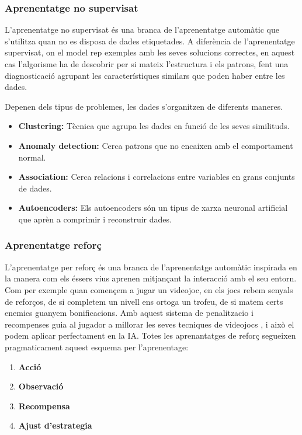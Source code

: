 \subsubsection{Aprenentatge no supervisat}\label{subsubsec:Aprenentatge no supervisat}

L'aprenentatge no supervisat és una branca de l'aprenentatge automàtic que s'utilitza quan no es disposa de dades etiquetades. A diferència de l'aprenentatge supervisat, on el model rep exemples amb les seves solucions correctes, en aquest cas l'algorisme ha de descobrir per si mateix l'estructura i els patrons, fent una diagnosticació agrupant les característiques similars que poden haber entre les dades.

Depenen dels tipus de  problemes, les dades s'organitzen de diferents maneres.
\begin{itemize}
 \item \textbf{Clustering:} Tècnica que agrupa les dades en funció de les seves similituds.
 \item \textbf{Anomaly detection:} Cerca patrons que no encaixen amb el comportament normal.
 \item \textbf{Association:} Cerca relacions i correlacions entre variables en grans conjunts de dades.
 \item \textbf{Autoencoders:} Els autoencoders són un tipus de xarxa neuronal artificial que aprèn a comprimir i reconstruir dades.
\end{itemize}


\subsubsection{Aprenentatge reforç}\label{subsubsec:Aprenentatge reforç}
L'aprenentatge per reforç és una branca de l'aprenentatge automàtic inspirada en la manera com els éssers vius aprenen mitjançant la interacció amb el seu entorn. Com per exemple quan començem a jugar un videojoc, en els jocs rebem senyals de reforços, de si completem un nivell ens ortoga un trofeu, de si matem certs enemics guanyem bonificacions. Amb aquest sistema de penalitzacio i recompenses guia al jugador a millorar les seves tecniques de videojocs , i això  el podem aplicar perfectament en la IA.
Totes les aprenantatges de reforç segueixen pragmaticament aquest esquema per l'aprenentage:
\begin{enumerate}
 \item \textbf{Acció}
 \item \textbf{Observació}
 \item \textbf{Recompensa}
 \item \textbf{Ajust d'estrategia}
\end{enumerate}



